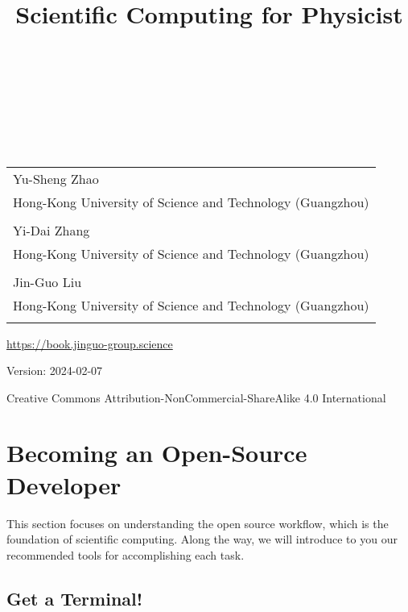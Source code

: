 \documentclass[
  notoc %
]{tufte-book}
\title{Scientific Computing for Physicist}
\author{\noindent{Yu-Sheng Zhao}\\[3mm] \noindent{Yi-Dai
Zhang}\\[3mm] \noindent{Jin-Guo Liu}\\[3mm] }
\date{}
\begin{document}
\makeatletter
\thispagestyle{empty}
\vfill
{\Huge\bf
\noindent
\@title
}\\[1in]
{\Large
\noindent
\@author
}
\makeatother

\makeatletter
\newpage
\thispagestyle{empty}
\vfill
{\noindent
\begin{tabular}{l} Yu-Sheng Zhao\\ Hong-Kong University of Science and Technology (Guangzhou)\\ \\ Yi-Dai Zhang\\ Hong-Kong University of Science and Technology (Guangzhou)\\ \\ Jin-Guo Liu\\ Hong-Kong University of Science and Technology (Guangzhou)\\ \\ \end{tabular}
}
\vfill
{\small
\url{https://book.jinguo-group.science}

Version: 2024-02-07

Creative Commons Attribution-NonCommercial-ShareAlike 4.0 International
}
\makeatother


\frontmatter
\mainmatter
{}

\setcounter{tocdepth}{1}
\tableofcontents

\justifying

\setlength{\parindent}{0pt}

\hypertarget{sec:open-source-dev-toolchains}{%
\chapter{Becoming an Open-Source
Developer}\label{sec:open-source-dev-toolchains}}

This section focuses on understanding the open source workflow, which is
the foundation of scientific computing. Along the way, we will introduce
to you our recommended tools for accomplishing each task.

\hypertarget{sec:terminal}{%
\section{Get a Terminal!}\label{sec:terminal}}
\end{document}
